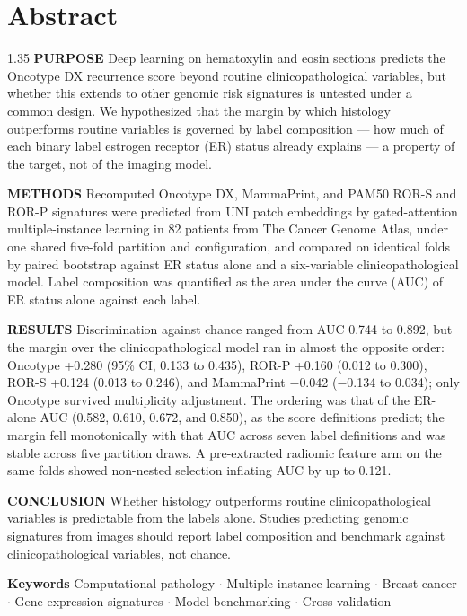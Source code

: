 \documentclass[11pt,a4paper]{article}
\begin{document}
\section*{Abstract}
\begin{spacing}{1.35}
\noindent\textbf{PURPOSE} Deep learning on hematoxylin and eosin sections predicts the Oncotype DX recurrence score beyond routine clinicopathological variables, but whether this extends to other genomic risk signatures is untested under a common design. We hypothesized that the margin by which histology outperforms routine variables is governed by label composition --- how much of each binary label estrogen receptor (ER) status already explains --- a property of the target, not of the imaging model.\par\smallskip
\noindent\textbf{METHODS} Recomputed Oncotype DX, MammaPrint, and PAM50 ROR-S and ROR-P signatures were predicted from UNI patch embeddings by gated-attention multiple-instance learning in 82 patients from The Cancer Genome Atlas, under one shared five-fold partition and configuration, and compared on identical folds by paired bootstrap against ER status alone and a six-variable clinicopathological model. Label composition was quantified as the area under the curve (AUC) of ER status alone against each label.\par\smallskip
\noindent\textbf{RESULTS} Discrimination against chance ranged from AUC 0.744 to 0.892, but the margin over the clinicopathological model ran in almost the opposite order: Oncotype +0.280 (95\% CI, 0.133 to 0.435), ROR-P +0.160 (0.012 to 0.300), ROR-S +0.124 (0.013 to 0.246), and MammaPrint $-$0.042 ($-$0.134 to 0.034); only Oncotype survived multiplicity adjustment. The ordering was that of the ER-alone AUC (0.582, 0.610, 0.672, and 0.850), as the score definitions predict; the margin fell monotonically with that AUC across seven label definitions and was stable across five partition draws. A pre-extracted radiomic feature arm on the same folds showed non-nested selection inflating AUC by up to 0.121.\par\smallskip
\noindent\textbf{CONCLUSION} Whether histology outperforms routine clinicopathological variables is predictable from the labels alone. Studies predicting genomic signatures from images should report label composition and benchmark against clinicopathological variables, not chance.\par\smallskip
\end{spacing}
\vspace{0.5em}
\noindent\textbf{Keywords} Computational pathology $\cdot$ Multiple instance learning $\cdot$ Breast cancer $\cdot$ Gene expression signatures $\cdot$ Model benchmarking $\cdot$ Cross-validation
\clearpage
\end{document}

